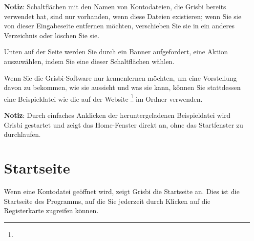 
\textbf{Notiz}: Schaltflächen mit den Namen von Kontodateien, die Grisbi bereits verwendet hat, sind nur vorhanden, wenn diese Dateien existieren; wenn Sie sie von dieser Eingabeseite entfernen möchten, verschieben Sie sie in ein anderes Verzeichnis oder löschen Sie sie.%


Unten auf der Seite werden Sie durch ein Banner aufgefordert, eine Aktion auszuwählen, indem Sie eine dieser Schaltflächen wählen.%


Wenn Sie die Grisbi-Software nur kennenlernen möchten, um eine Vorstellung davon zu bekommen, wie sie aussieht und was sie kann, können Sie stattdessen eine Beispieldatei wie die auf der Website \footnote{\urlSourceForgeDocumentation{}} im Ordner  verwenden.%


\textbf{Notiz}: Durch einfaches Anklicken der heruntergeladenen Beispieldatei wird Grisbi gestartet und zeigt das Home-Fenster direkt an, ohne das Startfenster zu durchlaufen.%

\section{Startseite\label{home}}%


Wenn eine Kontodatei geöffnet wird, zeigt Grisbi die Startseite an.%
Dies ist die Startseite des Programms, auf die Sie jederzeit durch Klicken auf die Registerkarte  zugreifen können.%

